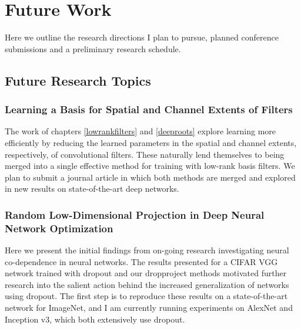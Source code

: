 \documentclass[thesis]{subfiles}
\begin{document}

\chapter{Future Work}  %
\label{futurework}


Here we outline the research directions I plan to pursue, planned conference submissions and a preliminary research schedule.

\section{Future Research Topics}

\subsection{Learning a Basis for Spatial and Channel Extents of Filters}
The work of chapters \ref{lowrankfilters} and \ref{deeproots} explore learning more efficiently by reducing the learned parameters in the spatial and channel extents, respectively, of convolutional filters. These naturally lend themselves to being merged into a single effective method for training with low-rank basis filters. We plan to submit a journal article in which both methods are merged and explored in new results on state-of-the-art deep networks.

\subsection{Random Low-Dimensional Projection in Deep Neural Network Optimization}
\label{pairablation}
Here we present the initial findings from on-going research investigating neural co-dependence in neural networks. The results presented for a CIFAR VGG network trained with dropout and our dropproject methods motivated further research into the salient action behind the increased generalization of networks using dropout. The first step is to reproduce these results on a state-of-the-art network for ImageNet, and I am currently running experiments on AlexNet and Inception v3, which both extensively use dropout.
\end{document}
